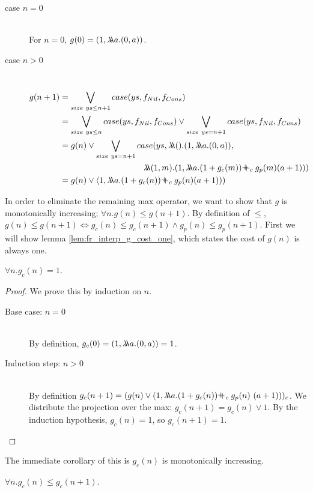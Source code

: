 \begin{description}
  \item[case $n=0$]\hfill \\
    For $n=0$, $g(0) = (1,\lambda\!\!\lambda a.(0,a))$.
  \item[case $n>0$]\hfill \\
    \begin{align*}
      g(n+1) &= \bigvee_{size\ ys \leq n+1} case(ys, f_{Nil}, f_{Cons}) \\
             &= \bigvee_{size\ ys \leq n} case(ys, f_{Nil}, f_{Cons}) \vee \bigvee_{size\ ys = n+1} case(ys, f_{Nil}, f_{Cons}) \\
             &= g(n) \vee \bigvee_{size\ ys = n+1} case(ys, \llambda().(1,\llambda a.( 0,a)), \\
             &\quadten \llambda (1,m).(1, \llambda a.(1 + g_c(m)) \pplus_c g_p(m) (a+1))) \\
             &= g(n) \vee \langle 1, \llambda a. (1 + g_c(n)) \pplus_c g_p(n) (a+1))) \\
    \end{align*}
\end{description}
%
In order to eliminate the remaining max operator, we want to show that $g$ is
monotonically increasing; $\forall n.g(n) \leq g(n+1)$.
By definition of $\leq$,
$g(n) \leq g(n+1) \Leftrightarrow g_c(n) \leq g_c(n+1) \land g_p(n) \leq g_p(n+1)$.
First we will show lemma \ref{lem:fr_interp_g_cost_one}, which states the cost
of $g(n)$ is always one.
%
\begin{lemma}
  \label{lem:fr_interp_g_cost_one}
  $\forall n. g_c(n) = 1$.
\end{lemma}
%
\begin{proof}
We prove this by induction on $n$.
  \begin{description}
    \item[Base case: $n=0$]\hfill \\
      By definition, $g_c(0) = (1, \lambda\!\!\lambda a.(0,a)) = 1$.
    \item[Induction step: $n>0$]\hfill \\
      By definition $g_c(n+1) = (g(n) \vee (1, \llambda a. (1 + g_c(n)) \pplus_c g_p(n)\ (a+1)))_c$.
      We distribute the projection over the max: $g_c(n+1) = g_c(n) \vee 1$.
      By the induction hypothesis, $g_c(n) = 1$, so $g_c(n+1) = 1$.
  \end{description}
\end{proof}
%
The immediate corollary of this is $g_c(n)$ is monotonically increasing.
%
\begin{corollary}
  \label{lem:fr_interp_g_cost_monotonically_increasing}
  $\forall n. g_c(n) \leq g_c(n+1)$.
\end{corollary}
